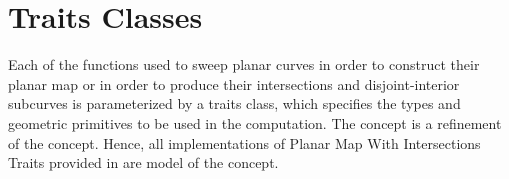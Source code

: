 
\section{Traits Classes}
Each of the functions used to sweep planar curves in order to construct 
their planar map or in order to produce their intersections and 
disjoint-interior subcurves 
is parameterized by a traits class, which specifies the types and geometric
primitives to be used in the computation.
The  concept is a refinement of the 
 concept. 
Hence, all implementations of Planar Map With Intersections Traits 
provided in \cgal are model of the  concept. 


%
